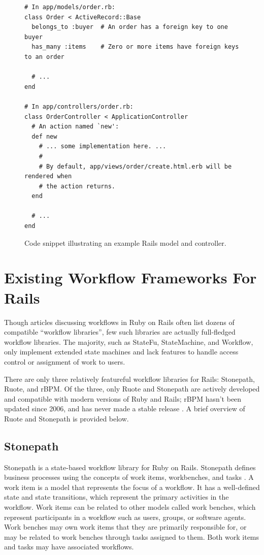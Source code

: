 \documentclass[document.tex]{subfiles}
\begin{document}
\begin{figure}[!ht]
  \begin{lstlisting}
# In app/models/order.rb:
class Order < ActiveRecord::Base
  belongs_to :buyer  # An order has a foreign key to one buyer
  has_many :items    # Zero or more items have foreign keys to an order

  # ...
end

# In app/controllers/order.rb:
class OrderController < ApplicationController
  # An action named `new':
  def new
    # ... some implementation here. ...
    #
    # By default, app/views/order/create.html.erb will be rendered when
    # the action returns.
  end

  # ...
end
  \end{lstlisting}
  \cprotect\caption{Code snippet illustrating an example Rails model and controller.}
  \label{fig:background-rails-code}
\end{figure}


\section {Existing Workflow Frameworks For Rails}
\label {sec:evaluating-existing-workflow-frameworks}

Though articles discussing workflows in Ruby on Rails often list dozens of compatible ``workflow libraries'', few such libraries are actually full-fledged workflow libraries. The majority, such as StateFu, StateMachine, and Workflow, only implement extended state machines and lack features to handle access control or assignment of work to users.

There are only three relatively featureful workflow libraries for Rails: Stonepath, Ruote, and rBPM. Of the three, only Ruote and Stonepath are actively developed and compatible with modern versions of Ruby and Rails; rBPM hasn't been updated since 2006, and has never made a stable release \cite{rbpm}. A brief overview of Ruote and Stonepath is provided below.

\subsection {Stonepath}

Stonepath is a state-based workflow library for Ruby on Rails. Stonepath defines business processes using the concepts of work items, workbenches, and tasks \cite{stonepath}. A work item is a model that represents the focus of a workflow. It has a well-defined state and state transitions, which represent the primary activities in the workflow. Work items can be related to other models called work benches, which represent participants in a workflow such as users, groups, or software agents. Work benches may own work items that they are primarily responsible for, or may be related to work benches through tasks assigned to them. Both work items and tasks may have associated workflows.
\end{document}
